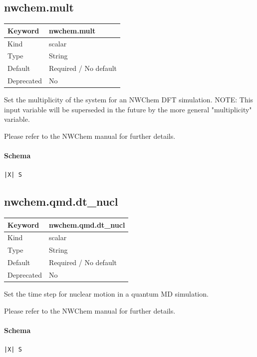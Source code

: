 \documentclass[11pt]{article}
\begin{document}
\subsection{nwchem.mult}
\label{kw:nwchem-mult}
\begin{longtable}{|p{1.5in}|p{4.5in}|}
\hline
Keyword & nwchem.mult \\
\hline
Kind & scalar \\
\hline
Type & String \\
\hline
Default & Required / No default \\
\hline
Deprecated & No \\
\hline
\end{longtable}
 Set the multiplicity of the system for an NWChem DFT simulation.
 NOTE: This input variable will be superseded in the future by the more
 general "multiplicity" variable.

 Please refer to the NWChem manual for further details.

\paragraph{Schema}
\begin{Verbatim}
|X| S
\end{Verbatim}

\subsection{nwchem.qmd.dt\_nucl}
\label{kw:nwchem-qmd-dt-nucl}
\begin{longtable}{|p{1.5in}|p{4.5in}|}
\hline
Keyword & nwchem.qmd.dt\_nucl \\
\hline
Kind & scalar \\
\hline
Type & String \\
\hline
Default & Required / No default \\
\hline
Deprecated & No \\
\hline
\end{longtable}
 Set the time step for nuclear motion in a quantum MD simulation.

 Please refer to the NWChem manual for further details.

\paragraph{Schema}
\begin{Verbatim}
|X| S
\end{Verbatim}
\end{document}
